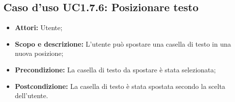 \subsection{Caso d'uso UC1.7.6: Posizionare testo}
\begin{itemize}
	\item \textbf{Attori:} Utente;
	\item \textbf{Scopo e descrizione:} L'utente può spostare una casella di testo in una nuova posizione;
	\item \textbf{Precondizione:} La casella di testo da spostare è stata selezionata;
	\item \textbf{Postcondizione:} La casella di testo è stata spostata secondo la scelta dell'utente.
\end{itemize}

